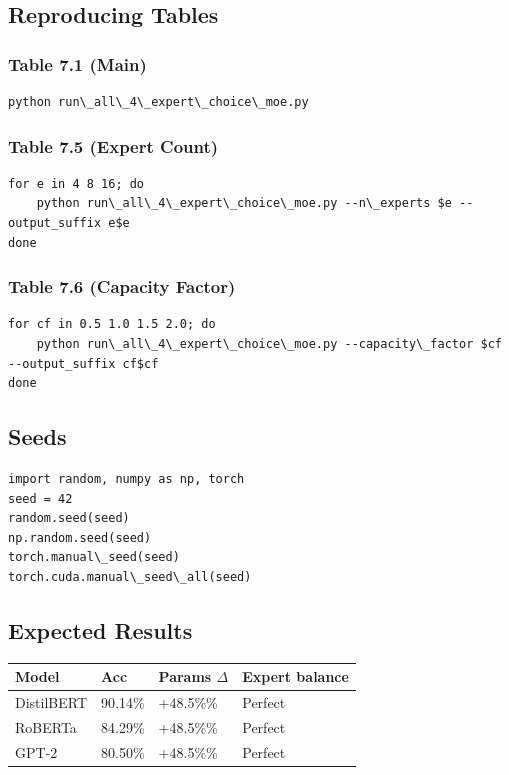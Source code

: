 \subsection{Reproducing Tables}

\subsubsection{Table 7.1 (Main)}
\begin{lstlisting}
python run\_all\_4\_expert\_choice\_moe.py
\end{lstlisting}

\subsubsection{Table 7.5 (Expert Count)}
\begin{lstlisting}
for e in 4 8 16; do
    python run\_all\_4\_expert\_choice\_moe.py --n\_experts $e --output_suffix e$e
done
\end{lstlisting}

\subsubsection{Table 7.6 (Capacity Factor)}
\begin{lstlisting}
for cf in 0.5 1.0 1.5 2.0; do
    python run\_all\_4\_expert\_choice\_moe.py --capacity\_factor $cf --output_suffix cf$cf
done
\end{lstlisting}

\subsection{Seeds}

\begin{lstlisting}
import random, numpy as np, torch
seed = 42
random.seed(seed)
np.random.seed(seed)
torch.manual\_seed(seed)
torch.cuda.manual\_seed\_all(seed)
\end{lstlisting}

\subsection{Expected Results}

\begin{table}[H]
\centering
\small
\begin{tabular}{llll}
\toprule
\textbf{Model} & \textbf{Acc} & \textbf{Params $\Delta$} & \textbf{Expert balance} \\
\midrule
DistilBERT & 90.14\% & +48.5\%\% & Perfect \\
RoBERTa & 84.29\% & +48.5\%\% & Perfect \\
GPT-2 & 80.50\% & +48.5\%\% & Perfect \\
\bottomrule
\end{tabular}
\end{table}

